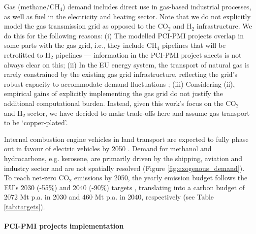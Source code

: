 \documentclass[pdflatex,sn-nature]{sn-jnl}%
\theoremstyle{thmstyleone}%
\theoremstyle{thmstyletwo}%
\theoremstyle{thmstylethree}%
\begin{document}
Gas (methane/CH$_4$) demand includes direct use in gas-based industrial processes, as well as fuel in the electricity and heating sector. Note that we do not explicitly model the gas transmission grid as opposed to the CO$_2$ and H$_2$ infrastructure. We do this for the following reasons: (i) The modelled PCI-PMI projects overlap in some parts with the gas grid, i.e., they include CH$_4$ pipelines that will be retrofitted to H$_2$ pipelines --- information in the PCI-PMI project sheets is not always clear on this; (ii) In the EU energy system, the transport of natural gas is rarely constrained by the existing gas grid infrastructure, reflecting the grid's robust capacity to accommodate demand fluctuations \cite{riepinModellingUncertaintyCoupled2021}; (iii) Considering (ii), empirical gains of explicitly implementing the gas grid do not justify the additional computational burden. 
Instead, given this work's focus on the CO$_2$ and H$_2$ sector, we have decided to make trade-offs here and assume gas transport to be `copper-plated'.

Internal combustion engine vehicles in land transport are expected to fully phase out in favour of electric vehicles by 2050 \cite{zeyenShiftingBurdensHow2025a}. Demand for methanol and hydrocarbons, e.g. kerosene, are primarily driven by the shipping, aviation and industry sector and are not spatially resolved (Figure \ref{fig:exogenous_demand}).
To reach net-zero CO$_2$ emissions by 2050, the yearly emission budget follows the EU's 2030 (-55\%) and 2040 (-90\%) targets \cite{europeancommissionFit55Delivering2021, europeancommission.directorategeneralforclimateaction.IndepthReportResults2024}, translating into a carbon budget of 2072 Mt p.a. in 2030 and 460 Mt p.a. in 2040, respectively (see Table \ref{tab:targets}).

\paragraph{PCI-PMI projects implementation}\label{sec:pci-pmi_projects_implementation}
\end{document}
